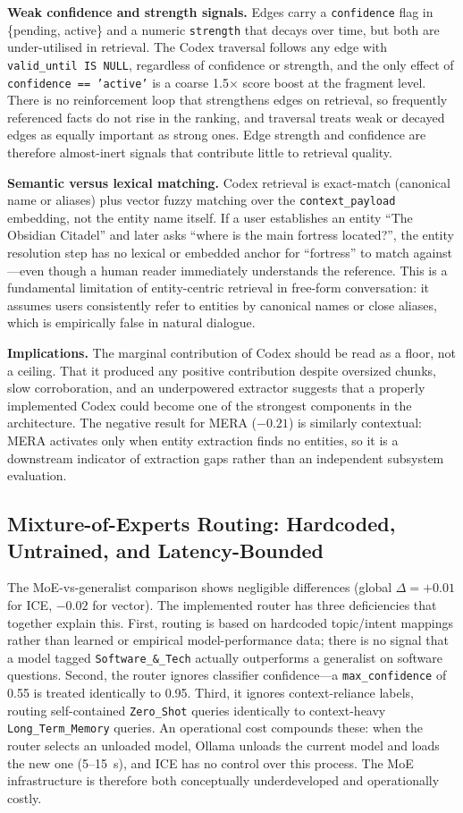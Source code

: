 \documentclass[11pt,a4paper]{article}
\begin{document}
\textbf{Weak confidence and strength signals.} Edges carry a \texttt{confidence}
flag in \{pending, active\} and a numeric \texttt{strength} that decays over time,
but both are under-utilised in retrieval. The Codex traversal follows any edge
with \texttt{valid\_until IS NULL}, regardless of confidence or strength, and the
only effect of \texttt{confidence == 'active'} is a coarse 1.5$\times$ score
boost at the fragment level. There is no reinforcement loop that strengthens
edges on retrieval, so frequently referenced facts do not rise in the ranking,
and traversal treats weak or decayed edges as equally important as strong ones.
Edge strength and confidence are therefore almost-inert signals that contribute
little to retrieval quality.

\textbf{Semantic versus lexical matching.} Codex retrieval is exact-match (canonical name or aliases) plus vector fuzzy matching over the \texttt{context\_payload} embedding, not the entity name itself. If a user establishes an entity ``The Obsidian Citadel'' and later asks ``where is the main fortress located?'', the entity resolution step has no lexical or embedded anchor for ``fortress'' to match against---even though a human reader immediately understands the reference. This is a fundamental limitation of entity-centric retrieval in free-form conversation: it assumes users consistently refer to entities by canonical names or close aliases, which is empirically false in natural dialogue.

\textbf{Implications.} The marginal contribution of Codex should be read as a floor, not a ceiling. That it produced any positive contribution despite oversized chunks, slow corroboration, and an underpowered extractor suggests that a properly implemented Codex could become one of the strongest components in the architecture. The negative result for MERA ($-0.21$) is similarly contextual: MERA activates only when entity extraction finds no entities, so it is a downstream indicator of extraction gaps rather than an independent subsystem evaluation.

\subsection{Mixture-of-Experts Routing: Hardcoded, Untrained, and Latency-Bounded}
The MoE-vs-generalist comparison shows negligible differences (global $\Delta = +0.01$ for ICE, $-0.02$ for vector). The implemented router has three deficiencies that together explain this. First, routing is based on hardcoded topic/intent mappings rather than learned or empirical model-performance data; there is no signal that a model tagged \texttt{Software\_\&\_Tech} actually outperforms a generalist on software questions. Second, the router ignores classifier confidence---a \texttt{max\_confidence} of 0.55 is treated identically to 0.95. Third, it ignores context-reliance labels, routing self-contained \texttt{Zero\_Shot} queries identically to context-heavy \texttt{Long\_Term\_Memory} queries. An operational cost compounds these: when the router selects an unloaded model, Ollama unloads the current model and loads the new one (5--15~s), and ICE has no control over this process. The MoE infrastructure is therefore both conceptually underdeveloped and operationally costly.
\end{document}
